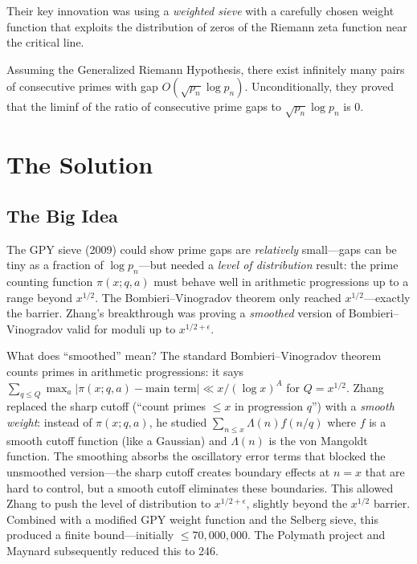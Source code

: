 Their key innovation was using a \emph{weighted sieve} with a carefully chosen weight function that exploits the distribution of zeros of the Riemann zeta function near the critical line.

\begin{theorem}
Assuming the Generalized Riemann Hypothesis, there exist infinitely many pairs of consecutive primes with gap $O(\sqrt{p_n} \log p_n)$. Unconditionally, they proved that the liminf of the ratio of consecutive prime gaps to $\sqrt{p_n} \log p_n$ is 0.
\end{theorem}

\section{The Solution}

\subsection{The Big Idea}
The GPY sieve (2009) could show prime gaps are \emph{relatively} small---gaps can be tiny as a fraction of $\log p_n$---but needed a \emph{level of distribution} result: the prime counting function $\pi(x; q, a)$ must behave well in arithmetic progressions up to a range beyond $x^{1/2}$. The Bombieri--Vinogradov theorem only reached $x^{1/2}$---exactly the barrier. Zhang's breakthrough was proving a \emph{smoothed} version of Bombieri--Vinogradov valid for moduli up to $x^{1/2+\epsilon}$.

What does ``smoothed'' mean? The standard Bombieri--Vinogradov theorem counts primes in arithmetic progressions: it says $\sum_{q \leq Q} \max_a |\pi(x;q,a) - \text{main term}| \ll x/(\log x)^A$ for $Q = x^{1/2}$. Zhang replaced the sharp cutoff (``count primes $\leq x$ in progression $q$'') with a \emph{smooth weight}: instead of $\pi(x;q,a)$, he studied $\sum_{n \leq x} \Lambda(n) f(n/q)$ where $f$ is a smooth cutoff function (like a Gaussian) and $\Lambda(n)$ is the von Mangoldt function. The smoothing absorbs the oscillatory error terms that blocked the unsmoothed version---the sharp cutoff creates boundary effects at $n = x$ that are hard to control, but a smooth cutoff eliminates these boundaries. This allowed Zhang to push the level of distribution to $x^{1/2+\epsilon}$, slightly beyond the $x^{1/2}$ barrier. Combined with a modified GPY weight function and the Selberg sieve, this produced a finite bound---initially $\leq 70{,}000{,}000$. The Polymath project and Maynard subsequently reduced this to 246.

